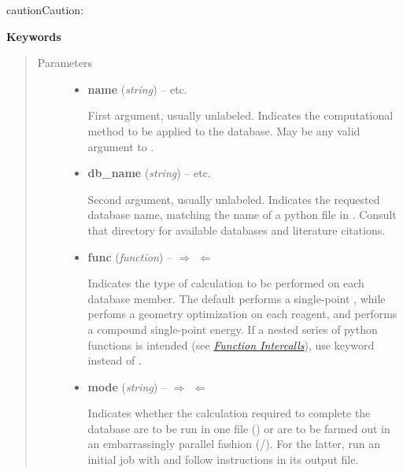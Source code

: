 \documentclass[letterpaper,10pt,english]{sphinxmanual}
\begin{document}
\begin{fulllineitems}
\begin{notice}{caution}{Caution:}
\begin{itemize}
\end{itemize}
\end{notice}

\textbf{Keywords}
\begin{quote}\begin{description}
\item[{Parameters}] \leavevmode\begin{itemize}
\item {} 
\textbf{name} (\emph{string}) -- 
 \textbar{}\textbar{}  \textbar{}\textbar{}  \textbar{}\textbar{} etc.

First argument, usually unlabeled. Indicates the computational method 
to be applied to the database. May be any valid argument to 
{\hyperref[index:driver.energy]{}}.


\item {} 
\textbf{db\_name} (\emph{string}) -- 
 \textbar{}\textbar{}  \textbar{}\textbar{}  \textbar{}\textbar{} etc.

Second argument, usually unlabeled. Indicates the requested database 
name, matching the name of a python file in . 
Consult that directory for available databases and literature citations.


\item {} 
\textbf{func} (\emph{function}) -- 
$\Rightarrow$  $\Leftarrow$ \textbar{}\textbar{}  \textbar{}\textbar{} 

Indicates the type of calculation to be performed on each database
member. The default performs a single-point , while
 perfoms a geometry optimization on each reagent, and
 performs a compound single-point energy. If a nested series
of python functions is intended (see {\hyperref[index:sec-intercalls]{\emph{Function Intercalls}}}), use
keyword  instead of .


\item {} 
\textbf{mode} (\emph{string}) -- 
$\Rightarrow$  $\Leftarrow$ \textbar{}\textbar{}  \textbar{}\textbar{} 

Indicates whether the calculation required to complete the
database are to be run in one file () or are to be
farmed out in an embarrassingly parallel fashion
(/).  For the latter, run an initial job with
 and follow instructions in its output file.



\end{itemize}
\end{description}
\end{quote}
\end{fulllineitems}
\end{document}
